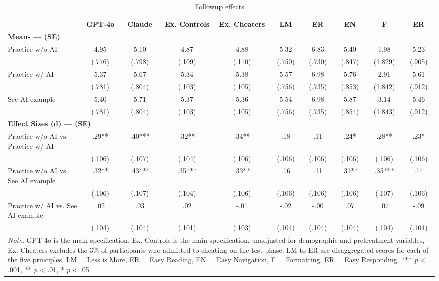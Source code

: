 \documentclass[11pt]{report}
\begin{document}
\begin{append}
\begin{landscape}
\begin{table}[h]
    \centering
        \caption{Followup effects}
\footnotesize
\begin{tabular}{lccccccccc}
\toprule
  & GPT-4o & Claude & Ex. Controls & Ex. Cheaters & LM & ER & EN & F & ER \\ 
\midrule
\multicolumn{10}{l}{\textbf{Means --- (SE)}} \\ 
\midrule
Practice w/o AI & 4.95 & 5.10 & 4.87 & 4.88 & 5.32 & 6.83 & 5.40 & 1.98 & 5.23 \\ 
 & (.776) & (.798) & (.109) & (.110) & (.750) & (.730) & (.847) & (1.829) & (.905) \\ 
Practice w/ AI & 5.37 & 5.67 & 5.34 & 5.38 & 5.57 & 6.98 & 5.76 & 2.91 & 5.61 \\ 
 & (.781) & (.804) & (.103) & (.105) & (.756) & (.735) & (.853) & (1.842) & (.912) \\ 
See AI example & 5.40 & 5.71 & 5.37 & 5.36 & 5.54 & 6.98 & 5.87 & 3.14 & 5.46 \\ 
 & (.781) & (.804) & (.103) & (.105) & (.756) & (.735) & (.854) & (1.843) & (.912) \\ 
\midrule
\multicolumn{10}{l}{\textbf{Effect Sizes (d) --- (SE)}} \\ 
\midrule
Practice w/o AI vs. Practice w/ AI & .29** & .40*** & .32** & .34** & .18 & .11 & .24* & .28** & .23* \\ 
 & (.106) & (.107) & (.104) & (.106) & (.106) & (.106) & (.106) & (.106) & (.106) \\ 
Practice w/o AI vs. See AI example & .32** & .43*** & .35*** & .33** & .16 & .11 & .31** & .35*** & .14 \\ 
 & (.106) & (.107) & (.104) & (.106) & (.106) & (.106) & (.106) & (.107) & (.106) \\ 
Practice w/ AI vs. See AI example & .02 & .03 & .02 & -.01 & -.02 & -.00 & .07 & .07 & -.09 \\ 
 & (.104) & (.104) & (.101) & (.103) & (.104) & (.104) & (.104) & (.104) & (.104) \\ 
\midrule
\multicolumn{10}{p{15cm}}{\textit{Note.} GPT-4o is the main specification. Ex. Controls is the main specification, unadjusted for demographic and pretreatment variables, Ex. Cheaters excludes the 3\% of participants who admitted to cheating on the test phase. LM to ER are disaggregated scores for each of the five principles. LM = Less is More, ER = Easy Reading, EN = Easy Navigation, F = Formatting, ER = Easy Responding. *** \textit{p} < .001, ** \textit{p} < .01, * \textit{p} < .05.}
\vspace{5pt}
\end{tabular}
    \label{tab:s3_followup}
\end{table}
\end{landscape}


\end{append}
\end{document}
